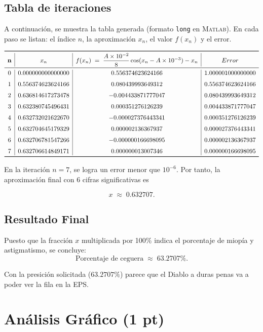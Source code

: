 \subsection{Tabla de iteraciones}

A continuación, se muestra la tabla generada (formato \texttt{long} en \textsc{Matlab}). En cada paso se listan: el índice \(n\), la aproximación \(x_n\), el valor \(f(x_n)\) y el error.

\[
\begin{array}{c|c|c|c}
\toprule
\textbf{n} 
& x_n 
& f(x_n)\;=\;\dfrac{A\times10^{-2}}{8}\cos(x_n - A\times 10^{-3}) - x_n
& Error \\
\midrule
0 & 0.000000000000000 & 0.556374623624166 & 1.000001000000000 \\[6pt]
1 & 0.556374623624166 & 0.080439993649312 & 0.556374623624166 \\[6pt]
2 & 0.636814617273478 & -0.004433871777047 & 0.080439993649312 \\[6pt]
3 & 0.632380745496431 & 0.000351276126239 & 0.004433871777047 \\[6pt]
4 & 0.632732021622670 & -0.000027376443341 & 0.000351276126239 \\[6pt]
5 & 0.632704645179329 & 0.000002136367937 & 0.000027376443341 \\[6pt]
6 & 0.632706781547266 & -0.000000166698095 & 0.000002136367937 \\[6pt]
7 & 0.632706614849171 & 0.000000013007346 & 0.000000166698095 \\
\bottomrule
\end{array}
\]

En la iteración \(n=7\), se logra un error menor que \(10^{-6}\). Por tanto, la aproximación final con 6 cifras significativas es

\[
x \;\approx\; 0.632707.
\]

\subsection{Resultado Final}

Puesto que la fracción \(x\) multiplicada por 100\% indica el porcentaje de miopía y astigmatismo, se concluye:
\[
\boxed{
\text{Porcentaje de ceguera} 
\;\approx\; 63.2707\%.
}
\]

Con la presición solicitada ($63.2707\%$) parece que el Diablo a duras penas va
a poder ver la fila en la EPS.

\section{Análisis Gráfico (1 pt)}


